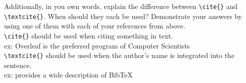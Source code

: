 \documentclass[10pt,twocolumn]{article}
\begin{document}
Additionally, in you own words, explain the difference between \texttt{{\textbackslash}cite\{\}} and \texttt{{\textbackslash}textcite\{\}}. When should they each be used? Demonstrate your answers by using one of them with each of your references from above.\\

\texttt{{\textbackslash}cite\{\}} should be used when citing something in text. \\

ex: Overleaf is the preferred program of Computer Scientists \cite{OverleafBibliographyManagement}\\

\texttt{{\textbackslash}textcite\{\}} should be used when the author's name is integrated into the sentence. \\

ex: \textcite{WikipediaBibtex} provides a wide description of BibTeX


\printbibliography
\end{document}
